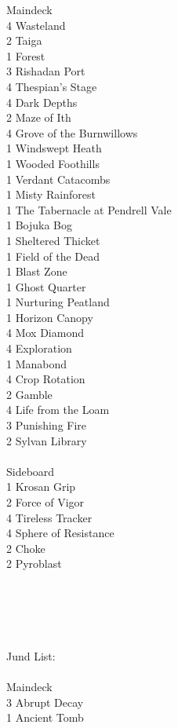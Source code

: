 \documentclass{report}
\begin{document}
Maindeck\\
4 Wasteland\\
2 Taiga\\
1 Forest\\
3 Rishadan Port\\
4 Thespian's Stage\\
4 Dark Depths\\
2 Maze of Ith\\
4 Grove of the Burnwillows\\
1 Windswept Heath\\
1 Wooded Foothills\\
1 Verdant Catacombs\\
1 Misty Rainforest\\
1 The Tabernacle at Pendrell Vale\\
1 Bojuka Bog\\
1 Sheltered Thicket\\
1 Field of the Dead\\
1 Blast Zone\\
1 Ghost Quarter\\
1 Nurturing Peatland\\
1 Horizon Canopy\\
4 Mox Diamond\\
4 Exploration\\
1 Manabond\\
4 Crop Rotation\\
2 Gamble\\
4 Life from the Loam\\
3 Punishing Fire\\
2 Sylvan Library\\\\
Sideboard\\
1 Krosan Grip\\
2 Force of Vigor\\
4 Tireless Tracker\\
4 Sphere of Resistance\\
2 Choke\\
2 Pyroblast\\\\\\\\\\\\
Jund List:\\\\
Maindeck\\
3 Abrupt Decay\\
1 Ancient Tomb\\
\end{document}
